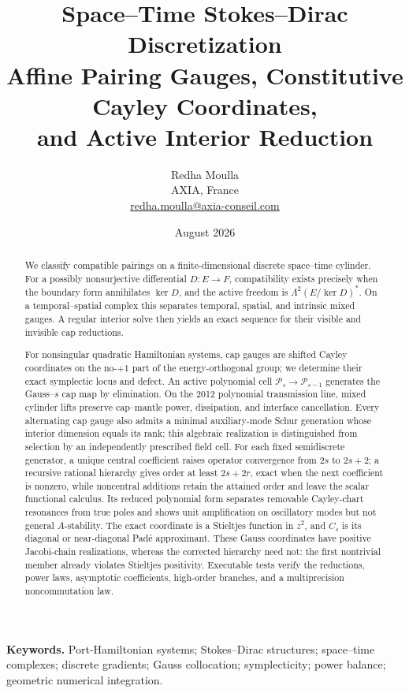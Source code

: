 \documentclass[11pt,a4paper]{article}
\title{\vspace{-1.2cm}\textbf{\color{axblue}Space--Time Stokes--Dirac Discretization}\\[0.35em]
\large Affine Pairing Gauges, Constitutive Cayley Coordinates,\\
and Active Interior Reduction}
\author{Redha Moulla\\
\small AXIA, France\\
\small \href{mailto:redha.moulla@axia-conseil.com}{redha.moulla@axia-conseil.com}}
\date{August 2026}
\begin{document}
\maketitle

\begin{abstract}
We classify compatible pairings on a finite-dimensional discrete
space--time cylinder.  For a possibly nonsurjective differential
\(D:E\to F\), compatibility exists precisely when the boundary form
annihilates \(\ker D\), and the active freedom is
\(\Lambda^2(E/\ker D)^*\).  On a temporal--spatial complex this separates
temporal, spatial, and intrinsic mixed gauges.  A regular interior solve
then yields an exact sequence for their visible and invisible cap
reductions.

For nonsingular quadratic Hamiltonian systems, cap gauges are shifted
Cayley coordinates on the no-\(+1\) part of the energy-orthogonal group;
we determine their exact symplectic locus and defect.  An active polynomial
cell \(\mathcal P_s\to\mathcal P_{s-1}\) generates the Gauss--\(s\) cap
map by elimination.  On the 2012 polynomial transmission line, mixed
cylinder lifts preserve cap--mantle power, dissipation, and interface
cancellation.  Every alternating cap gauge also admits a minimal
auxiliary-mode Schur generation whose interior dimension equals its rank;
this algebraic realization is distinguished from selection by an
independently prescribed field cell.  For each fixed semidiscrete generator, a unique central
coefficient raises operator convergence from \(2s\) to \(2s+2\); a
recursive rational hierarchy gives order at least \(2s+2r\), exact when
the next coefficient is nonzero, while
noncentral additions retain the attained order and leave the scalar
functional calculus.  Its reduced polynomial form separates removable
Cayley-chart resonances from true poles and shows unit amplification on
oscillatory modes but not general \(A\)-stability.  The exact coordinate is
a Stieltjes function in \(z^2\), and \(C_s\) is its diagonal or
near-diagonal Pad\'e approximant.  These Gauss coordinates have positive
Jacobi-chain realizations, whereas the corrected hierarchy need not: the
first nontrivial member already violates Stieltjes positivity.  Executable tests verify the reductions, power
laws, asymptotic coefficients, high-order branches, and a multiprecision
noncommutation law.
\end{abstract}

\noindent\textbf{Keywords.}
Port-Hamiltonian systems; Stokes--Dirac structures; space--time complexes;
discrete gradients; Gauss collocation; symplecticity; power balance;
geometric numerical integration.
\end{document}
